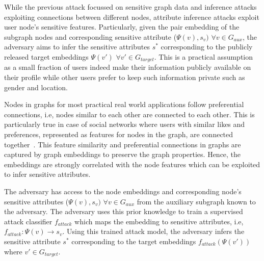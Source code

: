 While the previous attack focussed on sensitive graph data and inference attacks exploiting connections between different nodes, attribute inference attacks exploit user node's sensitive features.
Particularly, given the pair embedding of the subgraph nodes and corresponding sensitive attribute ($\Psi (v), s_{v})$ $\forall v \in G_{aux}$, the adversary aims to infer the sensitive attributes $s^*$ corresponding to the publicly released target embeddings $\Psi (v')$ $\forall v' \in G_{target}$.
This is a practical assumption as a small fraction of users indeed make their information publicly available on their profile while other users prefer to keep such information private such as gender and location.

Nodes in graphs for most practical real world applications follow preferential connections, i.e, nodes similar to each other are connected to each other.
This is particularly true in case of social networks where users with similar likes and preferences, represented as features for nodes in the graph, are connected together~\cite{socialinfer,socialinfer2}.
This feature similarity and preferential connections in graphs are captured by graph embeddings to preserve the graph properties.
Hence, the embeddings are strongly correlated with the node features which can be exploited to infer sensitive attributes.

The adversary has access to the node embeddings and corresponding node's sensitive attributes ($\Psi (v), s_{v})$ $\forall v \in G_{aux}$ from the auxiliary subgraph known to the adversary.
The adversary uses this prior knowledge to train a supervised attack classifier $f_{attack}$ which maps the embedding to sensitive attributes, i.e, $f_{attack}: \Psi (v) \rightarrow s_{v}$.
Using this trained attack model, the adversary infers the sensitive attribute $s^*$ corresponding to the target embeddings $f_{attack}(\Psi(v'))$ where $v' \in G_{target}$.
